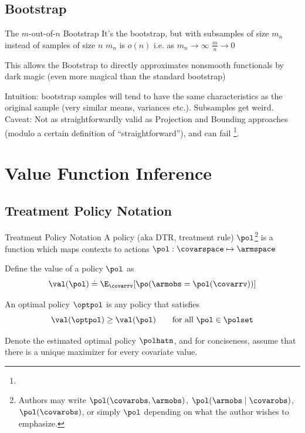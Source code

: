 \documentclass[aspectratio=169, professionalfonts]{beamer}
\begin{document}
\subsection{\mon Bootstrap}

\begin{frame}{The $m$-out-of-$n$ Bootstrap}
	It's the bootstrap, but with subsamples of size $m_n$ instead of samples of
	size $n$
	\vfill
	$m_n$ is $o(n)$ i.e. as $m_n \to \infty$ $\frac{m}{n} \to 0$
	\vfill \pause

	This allows the \mon Bootstrap to directly approximates nonsmooth
	functionals by dark magic (even more magical than the standard bootstrap)

	\vfill \pause
	Intuition: bootstrap samples will tend to have the same characteristics as
	the original sample (very similar means, variances etc.). Subsamples get
	weird.
	\vfill \pause
	Caveat: Not as straightforwardly valid as Projection and Bounding approaches
	(modulo a certain definition of ``straightforward''), and can fail
	\footnote<4->{}.
\end{frame}
\section{Value Function Inference}

\subsection{Treatment Policy Notation}

\begin{frame}{Treatment Policy Notation}
	A policy (aka DTR, treatment rule) $\pol$\footnote{	Authors may write $\pol(\covarobs,
			\armobs)$, $\pol(\armobs \mid \covarobs)$, $\pol(\covarobs)$, or
		simply $\pol$ depending on what the author wishes to emphasize.
	} is a function which maps contexts to actions $\pol: \covarspace
		\mapsto \armspace$



	\vfill \pause
	Define the value of a policy $\pol$ as
	\begin{equation*}
		\val(\pol) \doteq \E_{\covarrv}[\po(\armobs = \pol(\covarrv))]
	\end{equation*}

	\vfill \pause
	An optimal policy $\optpol$ is any policy that satisfies
	\begin{equation*}
		\val(\optpol) \geq \val(\pol) \qquad \text{for all }\pol \in
		\polset
	\end{equation*}

	\vfill \pause
	Denote the estimated optimal policy $\polhatn$, and for conciseness, assume
	that there is a unique maximizer for every covariate value.

\end{frame}
\end{document}
